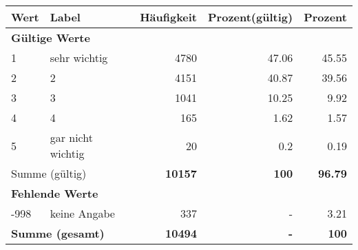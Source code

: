      \begin{longtable}{lXrrr}
     \toprule
     \textbf{Wert} & \textbf{Label} & \textbf{Häufigkeit} & \textbf{Prozent(gültig)} & \textbf{Prozent} \\
     \endhead
     \midrule
     \multicolumn{5}{l}{\textbf{Gültige Werte}}\\

     1 &
     \multicolumn{1}{X}{ sehr wichtig   } &


       \num{4780} &
       \num[round-mode=places,round-precision=2]{47,06} &
         \num[round-mode=places,round-precision=2]{45,55} \\

     2 &
     \multicolumn{1}{X}{ 2   } &


       \num{4151} &
       \num[round-mode=places,round-precision=2]{40,87} &
         \num[round-mode=places,round-precision=2]{39,56} \\

     3 &
     \multicolumn{1}{X}{ 3   } &


       \num{1041} &
       \num[round-mode=places,round-precision=2]{10,25} &
         \num[round-mode=places,round-precision=2]{9,92} \\

     4 &
     \multicolumn{1}{X}{ 4   } &


       \num{165} &
       \num[round-mode=places,round-precision=2]{1,62} &
         \num[round-mode=places,round-precision=2]{1,57} \\

     5 &
     \multicolumn{1}{X}{ gar nicht wichtig   } &


       \num{20} &
       \num[round-mode=places,round-precision=2]{0,2} &
         \num[round-mode=places,round-precision=2]{0,19} \\
     \midrule
     \multicolumn{2}{l}{Summe (gültig)} &
       \textbf{\num{10157}} &
     \textbf{100} &
       \textbf{\num[round-mode=places,round-precision=2]{96,79}} \\
     \multicolumn{5}{l}{\textbf{Fehlende Werte}}\\
       -998 &
       keine Angabe &
         \num{337} &
        - &
         \num[round-mode=places,round-precision=2]{3,21} \\
     \midrule
     \multicolumn{2}{l}{\textbf{Summe (gesamt)}} &
          \textbf{\num{10494}} &
        \textbf{-} &
        \textbf{100} \\
     \bottomrule
     \end{longtable}
     
